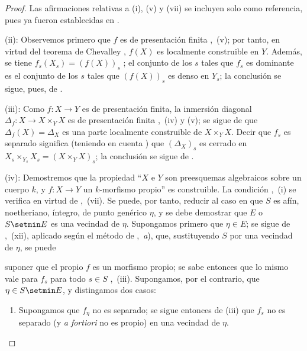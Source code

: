 \begin{proof}
Las afirmaciones relativas a (i), (v) y (vii) se incluyen solo como referencia, pues ya fueron establecidas en .

(ii): Observemos primero que $f$ es de presentación finita ,~(v); por tanto, en virtud del teorema de Chevalley , $f(X)$ es localmente construible en $Y$.
Además, se tiene $f_s(X_s)=(f(X))_s$ ; el conjunto de los $s$ tales que $f_s$ es dominante es el conjunto de los $s$ tales que $(f(X))_s$ es denso en $Y_s$; la conclusión se sigue, pues, de .

(iii): Como $f:X\to Y$ es de presentación finita, la inmersión diagonal $\Delta_f:X\to X\times_YX$ es de presentación finita ,~(iv) y (v); se sigue de  que $\Delta_f(X)=\Delta_X$ es una parte localmente construible de $X\times_YX$.
Decir que $f_s$ es separado significa (teniendo en cuenta ) que $(\Delta_X)_s$ es cerrado en $X_s\times_{Y_s}X_s=(X\times_YX)_s$; la conclusión se sigue de .



(iv): Demostremos que la propiedad ``$X$ e $Y$ son preesquemas algebraicos sobre un cuerpo $k$, y $f:X\to Y$ un $k$-morfismo propio'' es construible.
La condición ,~(i) se verifica en virtud de ,~(vii).
Se puede, por tanto, reducir al caso en que $S$ es afín, noetheriano, íntegro, de punto genérico $\eta$, y se debe demostrar que $E$ o $S\setmin E$ es una vecindad de $\eta$.
Supongamos primero que $\eta\in E$; se sigue de ,~(xii), aplicado según el método de ,~\emph{a}), que, sustituyendo $S$ por una vecindad de $\eta$, se puede

suponer que el propio $f$ es un morfismo propio; se sabe entonces que lo mismo vale para $f_s$ para todo $s\in S$ ,~(iii).
Supongamos, por el contrario, que $\eta\in S\setmin E$, y distingamos dos casos:
\begin{enumerate}[label=\upshape{$\arabic{enumi}^\circ$}]
  \item Supongamos que $f_\eta$ no es separado; se sigue entonces de (iii) que $f_s$ no es separado (y \emph{a fortiori} no es propio) en una vecindad de $\eta$.


\end{enumerate}
\end{proof}
